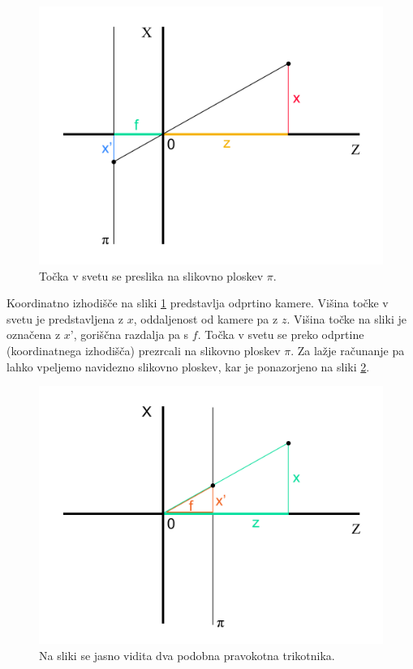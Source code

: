 \documentclass[a4paper, 12pt]{book}
\begin{document}
\begin{figure}[H]
\centering
\includegraphics[width=\textwidth,height=\textheight,keepaspectratio]{similar_triangles_1.png}
\caption{Točka v svetu se preslika na slikovno ploskev $\pi$.}
\label{similar1}
\end{figure}

Koordinatno izhodišče na sliki \ref{similar1} predstavlja odprtino kamere. Višina točke v svetu je predstavljena z $x$, oddaljenost od kamere pa z $z$. Višina točke na sliki je označena z $x’$, goriščna razdalja pa s $f$. Točka v svetu se preko odprtine (koordinatnega izhodišča) prezrcali na slikovno ploskev $\pi$. Za lažje računanje pa lahko vpeljemo navidezno slikovno ploskev, kar je ponazorjeno na sliki \ref{similar2}.

\begin{figure}[H]
\centering
\includegraphics[width=\textwidth,height=\textheight,keepaspectratio]{similar_triangles_2.png}
\caption{Na sliki se jasno vidita dva podobna pravokotna trikotnika.}
\label{similar2}
\end{figure}
\end{document}
